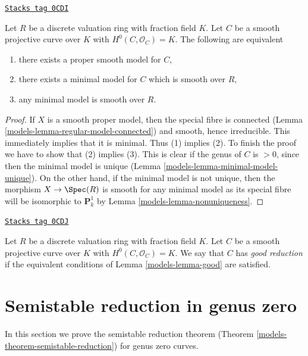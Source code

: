 \begin{lemma}[Good]
\label{models-lemma-good}
\href{https://stacks.math.columbia.edu/tag/0CDI}{\texttt{Stacks tag 0CDI}}

Let $R$ be a discrete valuation ring with fraction field $K$.
Let $C$ be a smooth projective curve over $K$ with $H^0(C, \mathcal{O}_C) = K$.
The following are equivalent
\begin{enumerate}
\item there exists a proper smooth model for $C$,
\item there exists a minimal model for $C$ which is smooth over $R$,
\item any minimal model is smooth over $R$.
\end{enumerate}
\end{lemma}

\begin{proof}

If $X$ is a smooth proper model, then the special fibre is
connected (Lemma \ref{models-lemma-regular-model-connected})
and smooth, hence irreducible. This immediately implies that
it is minimal. Thus (1) implies (2).
To finish the proof we have to show that (2) implies (3).
This is clear if the genus of $C$ is $> 0$, since then
the minimal model is unique (Lemma \ref{models-lemma-minimal-model-unique}).
On the other hand, if the minimal model is not unique, then
the morphism $X \to \Spec(R)$ is smooth for any minimal model
as its special fibre will be isomorphic to $\mathbf{P}^1_k$
by Lemma \ref{models-lemma-nonuniqueness}.
\end{proof}

\begin{definition}[Good]
\label{models-definition-good}
\href{https://stacks.math.columbia.edu/tag/0CDJ}{\texttt{Stacks tag 0CDJ}}

Let $R$ be a discrete valuation ring with fraction field $K$.
Let $C$ be a smooth projective curve over $K$ with $H^0(C, \mathcal{O}_C) = K$.
We say that $C$ has {\it good reduction} if the equivalent
conditions of Lemma \ref{models-lemma-good} are satisfied.
\end{definition}

\section{Semistable reduction in genus zero}
\label{models-section-semistable-reduction-genus-zero}
In this section we prove the semistable reduction theorem
(Theorem \ref{models-theorem-semistable-reduction})
for genus zero curves.

